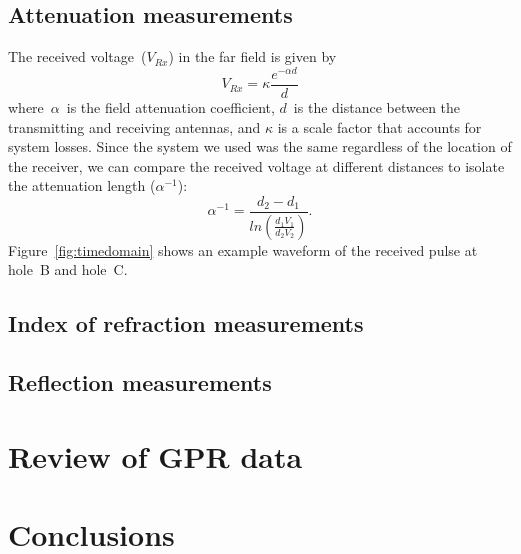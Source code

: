 \documentclass{article}
\begin{document}
  \subsection{Attenuation measurements}
  The received voltage~($V_{Rx}$) in the far field is given by
  \begin{equation}
    V_{Rx} = \kappa\frac{e^{-\alpha d}}{d}
  \end{equation}
  where~$\alpha$~is the field attenuation coefficient, $d$~is the distance between the 
  transmitting and receiving antennas, and $\kappa$ is a scale factor that accounts for 
  system losses.  Since the system we used was the same regardless of the location of the 
  receiver, we can compare the received voltage at different distances to isolate the 
  attenuation length ($\alpha^{-1}$):
  \begin{equation}
    \alpha^{-1}=\frac{d_2-d_1}{ln(\frac{d_1V_1}{d_2V_2})}.
  \end{equation}
  Figure~\ref{fig:timedomain} shows an example waveform of the received pulse at hole~B 
  and hole~C.
  

  \subsection{Index of refraction measurements}
  \subsection{Reflection measurements}

  \section{Review of GPR data}

  \section{Conclusions}

  
  
  
\end{document}
